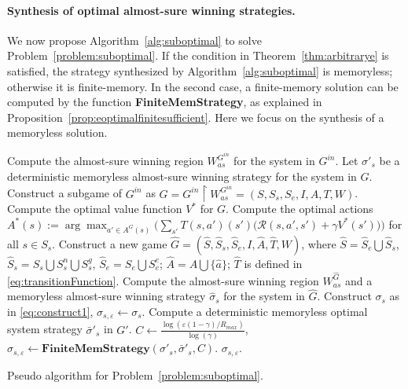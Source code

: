\documentclass[runningheads,a4paper]{llncs}
\begin{document}
\paragraph{Synthesis of optimal almost-sure winning strategies.} 
We now propose Algorithm~\ref{alg:suboptimal} to solve Problem~\ref{problem:suboptimal}. If the condition in Theorem~\ref{thm:arbitrarye} is satisfied, the strategy synthesized by Algorithm~\ref{alg:suboptimal} is memoryless; otherwise it is finite-memory. In the second case, a finite-memory solution can be computed by the function {\bf FiniteMemStrategy}, as explained in Proposition~\ref{prop:eoptimalfinitesufficient}. Here we focus on the synthesis of a memoryless solution. 


\begin{algorithm}[!t]
\begin{algorithmic}[1]
    \State Compute the almost-sure winning region $W_{as}^{G^{in}}$ for the system in $G^{in}$. Let $\sigma'_s$ be a deterministic memoryless almost-sure winning strategy for the system in $G$.
    \State \label{step:G}Construct a subgame of $G^{in}$ as $G = G^{in} \upharpoonright W_{as}^{G^{in}} = (S, S_s, S_e, I, A, T, W)$. 
    \State Compute the optimal value function $V^*$ for $G$. 
    \State Compute the optimal actions $A^*(s) := \arg\max_{a' \in A^G(s)} \Big( \sum_{s'} T(s, a')(s') \big( \mathcal{R}(s,a',s') + \gamma V^*(s') \big) \Big)$ for all $s \in S_s$.
    \State \label{step:hatG}Construct a new game $\hat{G} = (\hat{S}, \hat{S}_s, \hat{S}_e, I, \hat{A}, \hat{T}, W)$, where $\hat{S} = \hat{S}_e \bigcup \hat{S}_s$, $\hat{S}_s = S_s \bigcup S_s^n \bigcup S_s^g$,  $\hat{S}_e = S_e \bigcup S_e^e$; $\hat{A} = A \bigcup \{\hat{a}\}$; $\hat{T}$ is defined in \eqref{eq:transitionFunction}. 
\State \label{step:ashatG}Compute the almost-sure winning region ${W}_{as}^{\hat{G}}$ and a memoryless almost-sure winning strategy $\hat{\sigma}_s$ for the system in $\hat{G}$. 
\State \label{step:memoryless}Construct $\sigma_s$ as in \eqref{eq:construct1}, $\sigma_{s,\varepsilon} \gets \sigma_s$.
    \Else
        \State Compute a deterministic memoryless optimal system strategy $\bar{\sigma}'_s$ in $G'$.
        \State $C \gets \frac{\log(\varepsilon (1-\gamma) / R_{max})}{\log(\gamma)}$, $\sigma_{s, \varepsilon} \gets \textbf{FiniteMemStrategy}(\sigma'_s, \bar{\sigma}'_s, C)$. 
\EndIf
    \State \Return $\sigma_{s,\varepsilon}$.
\end{algorithmic}
\caption{Pseudo algorithm for Problem~\ref{problem:suboptimal}.}
\label{alg:suboptimal}
\end{algorithm}
\end{document}
